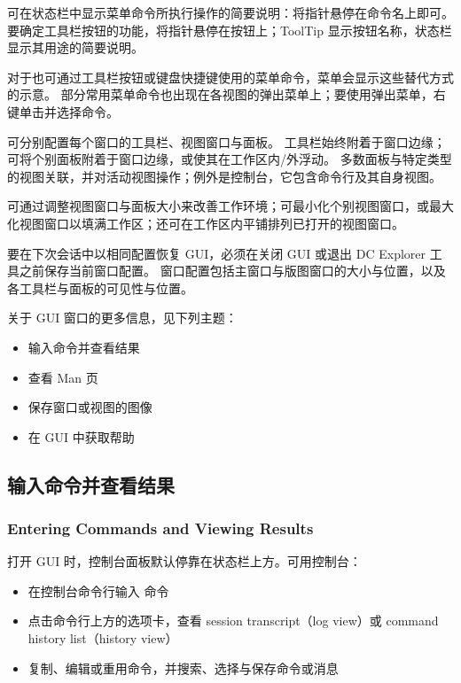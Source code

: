 
可在状态栏中显示菜单命令所执行操作的简要说明：将指针悬停在命令名上即可。
要确定工具栏按钮的功能，将指针悬停在按钮上；ToolTip 显示按钮名称，状态栏显示其用途的简要说明。

对于也可通过工具栏按钮或键盘快捷键使用的菜单命令，菜单会显示这些替代方式的示意。
部分常用菜单命令也出现在各视图的弹出菜单上；要使用弹出菜单，右键单击并选择命令。

可分别配置每个窗口的工具栏、视图窗口与面板。
工具栏始终附着于窗口边缘；可将个别面板附着于窗口边缘，或使其在工作区内/外浮动。
多数面板与特定类型的视图关联，并对活动视图操作；例外是控制台，它包含命令行及其自身视图。

可通过调整视图窗口与面板大小来改善工作环境；可最小化个别视图窗口，或最大化视图窗口以填满工作区；还可在工作区内平铺排列已打开的视图窗口。

要在下次会话中以相同配置恢复 GUI，必须在关闭 GUI 或退出 DC Explorer 工具之前保存当前窗口配置。
窗口配置包括主窗口与版图窗口的大小与位置，以及各工具栏与面板的可见性与位置。

关于 GUI 窗口的更多信息，见下列主题：
\begin{itemize}
  \item 输入命令并查看结果
  \item 查看 Man 页
  \item 保存窗口或视图的图像
  \item 在 GUI 中获取帮助
\end{itemize}

\subsection{输入命令并查看结果}
\subsubsection*{Entering Commands and Viewing Results}

打开 GUI 时，控制台面板默认停靠在状态栏上方。可用控制台：
\begin{itemize}
  \item 在控制台命令行输入  命令
  \item 点击命令行上方的选项卡，查看 session transcript（log view）或 command history list（history view）
  \item 复制、编辑或重用命令，并搜索、选择与保存命令或消息
\end{itemize}

